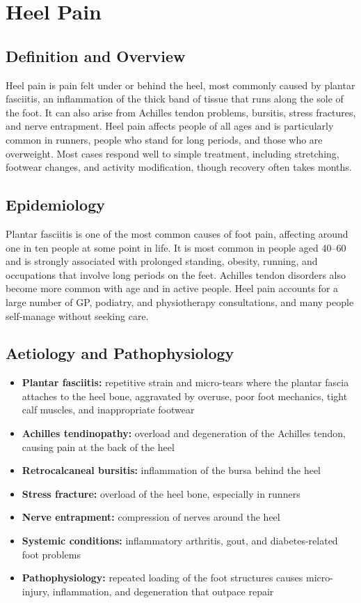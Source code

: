 \chapter{Heel Pain}

\section*{Definition and Overview}
Heel pain is pain felt under or behind the heel, most commonly caused by plantar fasciitis, an inflammation of the thick band of tissue that runs along the sole of the foot. It can also arise from Achilles tendon problems, bursitis, stress fractures, and nerve entrapment. Heel pain affects people of all ages and is particularly common in runners, people who stand for long periods, and those who are overweight. Most cases respond well to simple treatment, including stretching, footwear changes, and activity modification, though recovery often takes months.

\section*{Epidemiology}
Plantar fasciitis is one of the most common causes of foot pain, affecting around one in ten people at some point in life. It is most common in people aged 40--60 and is strongly associated with prolonged standing, obesity, running, and occupations that involve long periods on the feet. Achilles tendon disorders also become more common with age and in active people. Heel pain accounts for a large number of GP, podiatry, and physiotherapy consultations, and many people self-manage without seeking care.

\section*{Aetiology and Pathophysiology}
\begin{itemize}
    \item \textbf{Plantar fasciitis:} repetitive strain and micro-tears where the plantar fascia attaches to the heel bone, aggravated by overuse, poor foot mechanics, tight calf muscles, and inappropriate footwear
    \item \textbf{Achilles tendinopathy:} overload and degeneration of the Achilles tendon, causing pain at the back of the heel
    \item \textbf{Retrocalcaneal bursitis:} inflammation of the bursa behind the heel
    \item \textbf{Stress fracture:} overload of the heel bone, especially in runners
    \item \textbf{Nerve entrapment:} compression of nerves around the heel
    \item \textbf{Systemic conditions:} inflammatory arthritis, gout, and diabetes-related foot problems
    \item \textbf{Pathophysiology:} repeated loading of the foot structures causes micro-injury, inflammation, and degeneration that outpace repair
\end{itemize}


